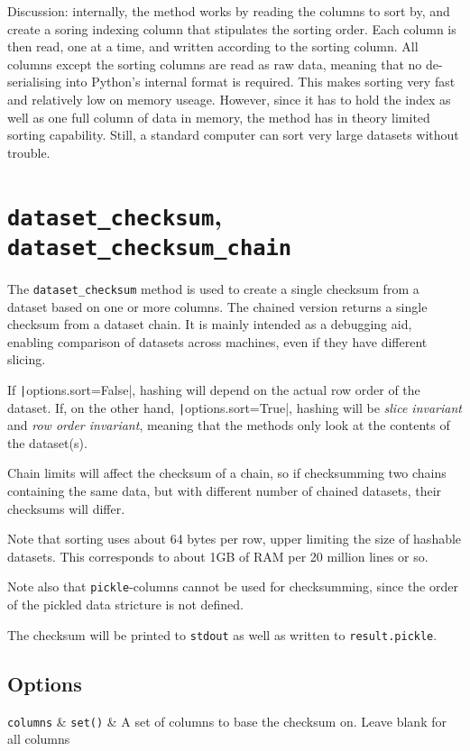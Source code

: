 Discussion: internally, the method works by reading the columns to
sort by, and create a soring indexing column that stipulates the
sorting order.  Each column is then read, one at a time, and written
according to the sorting column.  All columns except the sorting
columns are read as raw data, meaning that no de-serialising into
Python's internal format is required.  This makes sorting very fast
and relatively low on memory useage.  However, since it has to hold
the index as well as one full column of data in memory, the method has
in theory limited sorting capability.  Still, a standard computer can
sort very large datasets without trouble.


\clearpage
\section{\texttt{dataset\_checksum}, \texttt{dataset\_checksum\_chain}}

The \texttt{dataset\_checksum} method is used to create a single
checksum from a dataset based on one or more columns.  The chained
version returns a single checksum from a dataset chain.  It is mainly
intended as a debugging aid, enabling comparison of datasets across
machines, even if they have different slicing.

If \texttt|options.sort=False|, hashing will depend on the
actual row order of the dataset.  If, on the other
hand, \texttt|options.sort=True|, hashing will
be \textsl{slice invariant} and \textsl{row order invariant}, meaning
that the methods only look at the contents of the dataset(s).

Chain limits will affect the checksum of a chain, so if checksumming
two chains containing the same data, but with different number of
chained datasets, their checksums will differ.

Note that sorting uses about 64 bytes per row, upper limiting the size
of hashable datasets.  This corresponds to about 1GB of RAM per 20
million lines or so.

Note also that \texttt{pickle}-columns cannot be used for
checksumming, since the order of the pickled data stricture is not
defined.

The checksum will be printed to \texttt{stdout} as well as written to
\texttt{result.pickle}.

\subsection*{Options}
\starttable
\RP \texttt{columns} & \texttt{set()} & A set of columns to base the checksum on.  Leave blank for all columns\\

